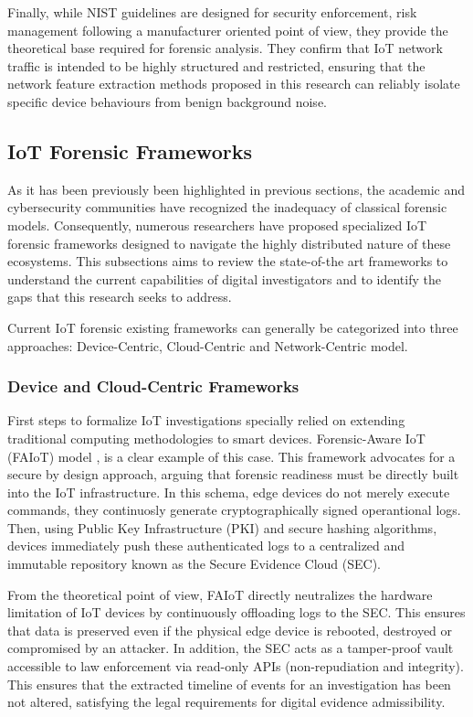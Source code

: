 Finally, while NIST guidelines are designed for security enforcement, risk management following a manufacturer oriented point of view, they provide the theoretical base required for forensic analysis. They confirm that IoT network traffic is intended to be highly structured and restricted, ensuring that the network feature extraction methods proposed in this research can reliably isolate specific device behaviours from benign background noise.


\subsection{IoT Forensic Frameworks}
As it has been previously been highlighted in previous sections, the academic and cybersecurity communities have recognized the inadequacy of classical forensic models. Consequently, numerous researchers have proposed specialized IoT forensic frameworks designed to navigate the highly distributed nature of these ecosystems. This subsections aims to review the state-of-the art frameworks to understand the current capabilities of digital investigators and to identify the gaps that this research seeks to address.

Current IoT forensic existing frameworks can generally be categorized into three approaches: Device-Centric, Cloud-Centric and Network-Centric model.

\subsubsection{Device and Cloud-Centric Frameworks}

First steps to formalize IoT investigations specially relied on extending traditional computing methodologies to smart devices.  Forensic-Aware IoT (FAIoT) model \cite{7207364}, is a clear example of this case. This framework advocates for a secure by design approach, arguing that forensic readiness must be directly built into the IoT infrastructure. In this schema, edge devices do not merely execute commands, they continuosly generate cryptographically signed operantional logs. Then, using Public Key Infrastructure (PKI) and secure hashing algorithms, devices immediately push these authenticated logs to a centralized and immutable repository known as the Secure Evidence Cloud (SEC). 

From the theoretical point of view, FAIoT directly neutralizes the hardware limitation of IoT devices by continuously offloading logs to the SEC. This ensures that data is preserved even if the physical edge device is rebooted, destroyed or compromised by an attacker. In addition, the SEC acts as a tamper-proof vault accessible to law enforcement via read-only APIs (non-repudiation and integrity). This ensures that the extracted timeline of events for an investigation has been not altered, satisfying the legal requirements for digital evidence admissibility. 

